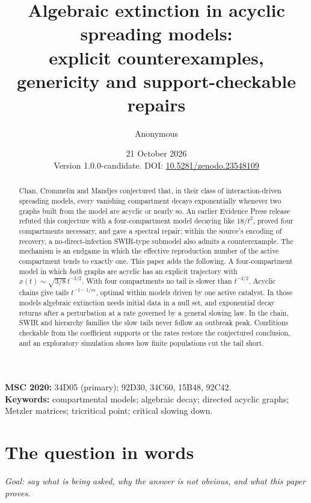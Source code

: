 \documentclass[11pt,a4paper]{article}
\title{Algebraic extinction in acyclic spreading models:\\
explicit counterexamples, genericity and support-checkable repairs}
\author{Anonymous}
\date{21 October 2026 \\ \small Version 1.0.0-candidate. DOI: \href{https://doi.org/10.5281/zenodo.23548109}{10.5281/zenodo.23548109}}
\theoremstyle{definition}\newtheorem{definition}[theorem]{Definition}
\theoremstyle{remark}\newtheorem{remark}[theorem]{Remark}
\begin{document}
\maketitle

\begin{abstract}
Chan, Crommelin and Mandjes conjectured that, in their class of
interaction-driven spreading models, every vanishing compartment decays
exponentially whenever two graphs built from the model are acyclic or
nearly so. An earlier Evidence Press release refuted this conjecture with a
four-compartment model decaying like $18/t^2$, proved four compartments
necessary, and gave a spectral repair; within the source's encoding of
recovery, a no-direct-infection SWIR-type submodel also admits a
counterexample. The mechanism is an endgame in which the effective
reproduction number of the active compartment tends to exactly one.
This paper adds the following. A four-compartment model in which
\emph{both} graphs are acyclic has an explicit trajectory with
$x(t)\sim\sqrt{3/8}\,t^{-3/2}$. With four compartments no tail is slower
than $t^{-3/2}$. Acyclic chains give tails $t^{-1-1/m}$, optimal within
models driven by one active catalyst. In those models algebraic
extinction needs initial data in a null set, and exponential decay
returns after a perturbation at a rate governed by a general slowing
law. In the chain, SWIR and hierarchy families the slow tails never
follow an outbreak peak. Conditions checkable from the coefficient supports or the rates
restore the conjectured conclusion, and an exploratory simulation shows
how finite populations cut the tail short.
\end{abstract}

\noindent\textbf{MSC 2020:} 34D05 (primary); 92D30, 34C60, 15B48, 92C42.\\
\noindent\textbf{Keywords:} compartmental models; algebraic decay;
directed acyclic graphs; Metzler matrices; tricritical point;
critical slowing down.

\section{The question in words}
\label{sec:intro}

\emph{Goal: say what is being asked, why the answer is not obvious, and
what this paper proves.}
\end{document}
